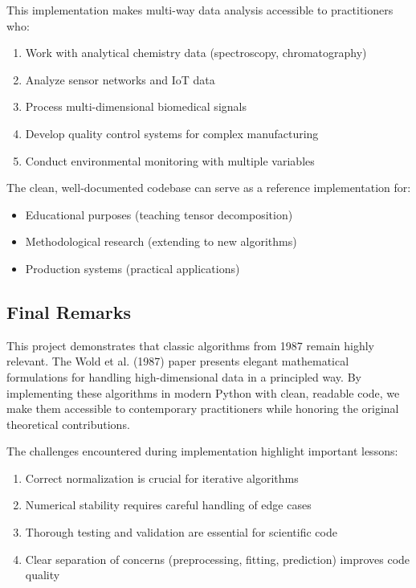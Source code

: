 \documentclass[12pt,a4paper]{article}
\begin{document}
This implementation makes multi-way data analysis accessible to practitioners who:
\begin{enumerate}
    \item Work with analytical chemistry data (spectroscopy, chromatography)
    \item Analyze sensor networks and IoT data
    \item Process multi-dimensional biomedical signals
    \item Develop quality control systems for complex manufacturing
    \item Conduct environmental monitoring with multiple variables
\end{enumerate}

The clean, well-documented codebase can serve as a reference implementation for:
\begin{itemize}
    \item Educational purposes (teaching tensor decomposition)
    \item Methodological research (extending to new algorithms)
    \item Production systems (practical applications)
\end{itemize}

\subsection{Final Remarks}

This project demonstrates that classic algorithms from 1987 remain highly relevant. The Wold et al. (1987) paper presents elegant mathematical formulations for handling high-dimensional data in a principled way. By implementing these algorithms in modern Python with clean, readable code, we make them accessible to contemporary practitioners while honoring the original theoretical contributions.

The challenges encountered during implementation highlight important lessons:
\begin{enumerate}
    \item Correct normalization is crucial for iterative algorithms
    \item Numerical stability requires careful handling of edge cases
    \item Thorough testing and validation are essential for scientific code
    \item Clear separation of concerns (preprocessing, fitting, prediction) improves code quality
\end{enumerate}
\end{document}
